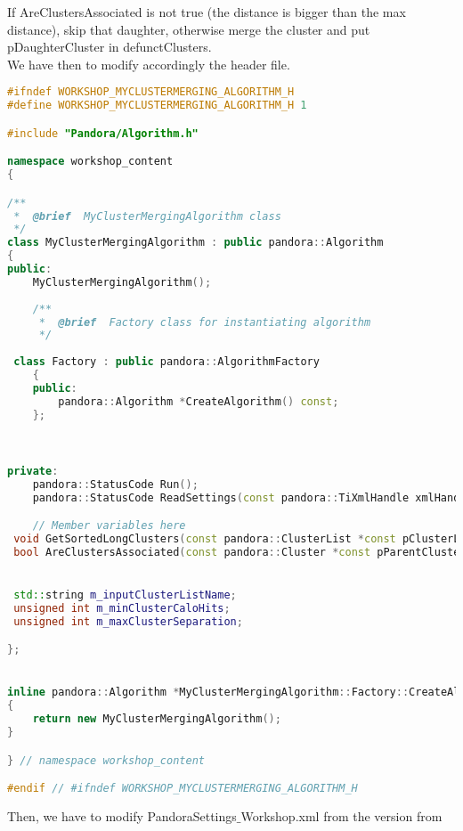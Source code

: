 If AreClustersAssociated is not true (the distance is bigger than the max distance), skip that daughter, otherwise merge the cluster and put pDaughterCluster in defunctClusters.\\
We have then to modify accordingly the header file.
\begin{lstlisting}[language=C++, caption=MyClusterMergingAlgorithm.h]
#ifndef WORKSHOP_MYCLUSTERMERGING_ALGORITHM_H
#define WORKSHOP_MYCLUSTERMERGING_ALGORITHM_H 1

#include "Pandora/Algorithm.h"

namespace workshop_content
{

/**
 *  @brief  MyClusterMergingAlgorithm class
 */
class MyClusterMergingAlgorithm : public pandora::Algorithm
{
public:
    MyClusterMergingAlgorithm();
	
    /**
     *  @brief  Factory class for instantiating algorithm
     */
  
 class Factory : public pandora::AlgorithmFactory
    {
    public:
        pandora::Algorithm *CreateAlgorithm() const;
    };


	
private:
    pandora::StatusCode Run();
    pandora::StatusCode ReadSettings(const pandora::TiXmlHandle xmlHandle);

    // Member variables here
 void GetSortedLongClusters(const pandora::ClusterList *const pClusterList, pandora::ClusterVector &sortedLongClusters) const;
 bool AreClustersAssociated(const pandora::Cluster *const pParentCluster, const pandora::Cluster *const pDaughterCluster) const;


 std::string m_inputClusterListName;
 unsigned int m_minClusterCaloHits;
 unsigned int m_maxClusterSeparation;

};


inline pandora::Algorithm *MyClusterMergingAlgorithm::Factory::CreateAlgorithm() const
{
    return new MyClusterMergingAlgorithm();
}

} // namespace workshop_content

#endif // #ifndef WORKSHOP_MYCLUSTERMERGING_ALGORITHM_H
\end{lstlisting}
Then, we have to modify PandoraSettings${\_}$Workshop.xml from the version from
